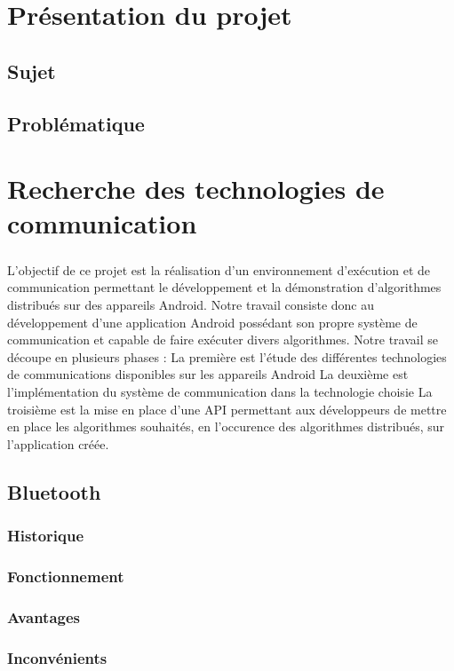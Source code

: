 \documentclass[a4paper,10pt]{report}
\begin{document}
\chapter{Présentation du projet}
  \section{Sujet}
  \section{Problématique}
\chapter{Recherche des technologies de communication}
  \paragraph{}
  L'objectif de ce projet est la réalisation d'un environnement d'exécution et de communication permettant le développement et la démonstration d'algorithmes distribués sur des appareils Android. Notre travail consiste donc au développement d'une application Android possédant son propre système de communication et capable de faire exécuter divers algorithmes.
  Notre travail se découpe en plusieurs phases :
  La première est l'étude des différentes technologies de communications disponibles sur les appareils Android
  La deuxième est l'implémentation du système de communication dans la technologie choisie
  La troisième est la mise en place d'une API permettant aux développeurs de mettre en place les algorithmes souhaités, en l'occurence des algorithmes distribués, sur l'application créée.
  \section{Bluetooth}
    \subsection{Historique}
    \subsection{Fonctionnement} 
    \subsection{Avantages}
    \subsection{Inconvénients}
\end{document}

